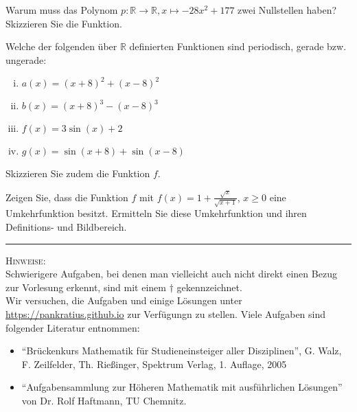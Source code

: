 \documentclass[11pt]{article}
\begin{document}
\begin{task}
	Warum muss das Polynom $p:\mathbb{R}\to \mathbb{R},x\mapsto -28x^2+177$ zwei Nullstellen haben? Skizzieren Sie die Funktion.
\end{task}
\begin{task}
Welche der folgenden \"uber $\mathbb{R}$ definierten Funktionen sind periodisch, gerade bzw. ungerade:
\begin{enumerate}[i)]
	\item $a(x)=(x+8)^2+(x-8)^2$
	\item $b(x)=(x+8)^3-(x-8)^3$
	\item $f(x) = 3\sin(x)+2$
	\item $g(x)=\sin(x+8)+\sin(x-8)$
\end{enumerate}
Skizzieren Sie zudem die Funktion $f$.
\end{task}
\begin{htask}
	Zeigen Sie, dass die Funktion $f$ mit $f(x)=1+\frac{\sqrt{x}}{\sqrt{x+1}}$, $x \geq 0$ eine Umkehrfunktion besitzt. Ermitteln Sie diese Umkehrfunktion und ihren Definitions- und Bildbereich.
\end{htask}

\hrule
\vspace{.5cm}
\noindent
\textsc{Hinweise:}\\
Schwierigere Aufgaben, bei denen man vielleicht auch nicht direkt einen Bezug zur Vorlesung erkennt, sind mit einem $\dagger$ gekennzeichnet.\\
Wir versuchen, die Aufgaben und einige Lösungen unter \url{https://pankratius.github.io} zur Verfügungn zu stellen.
Viele Aufgaben sind folgender Literatur entnommen:
\begin{itemize}
	\item ``Br\"uckenkurs Mathematik f\"ur Studieneinsteiger aller Disziplinen'', G. Walz, F. Zeilfelder, Th. Rie\ss inger, Spektrum Verlag, 1. Auflage, 2005
	\item ``Aufgabensammlung zur H\"oheren Mathematik mit ausf\"uhrlichen L\"osungen'' von Dr. Rolf Haftmann, TU Chemnitz.
\end{itemize}
\end{document}
